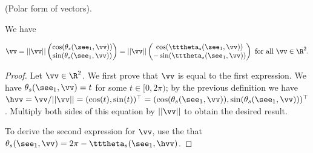 \begin{theorem}
	\label{ch::lin_alg::thm::vector_polar_form}
	(Polar form of vectors).
	
	We have
	
	\begin{align*}
		\vv =
		||\vv||
		\begin{pmatrix}
			\cos(\theta_s(\see_1, \vv)) \\
			\sin(\theta_s(\see_1, \vv))
		\end{pmatrix}
		=
		||\vv||
		\begin{pmatrix}
			\cos(\tttheta_s(\see_1, \vv)) \\
			-\sin(\tttheta_s(\see_1, \vv))
		\end{pmatrix}
		\text{ for all $\vv \in \R^2$}.
	\end{align*}
\end{theorem}

\begin{proof}
	Let $\vv \in \R^2$. We first prove that $\vv$ is equal to the first expression. We have $\theta_s(\see_1, \vv) = t$ for some $t \in [0, 2\pi)$; by the previous definition we have $\hvv = \vv/||\vv|| = (\cos(t), \sin(t))^\top = (\cos(\theta_s(\see_1, \vv)), \sin(\theta_s(\see_1, \vv)))^\top$. Multiply both sides of this equation by $||\vv||$ to obtain the desired result.
	
	To derive the second expression for $\vv$, use the that $\theta_s(\see_1, \vv) = 2\pi - \tttheta_s(\see_1, \hvv)$.
\end{proof}

